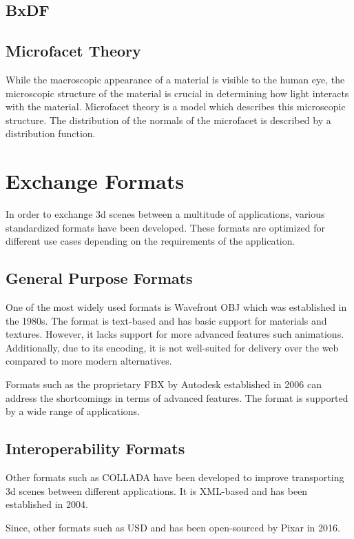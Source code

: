 \subsection{BxDF}
\subsection{Microfacet Theory}

While the macroscopic appearance of a material is visible to the human eye, the microscopic structure of the material is crucial in determining how light interacts with the material. Microfacet theory is a model which describes this microscopic structure. The distribution of the normals of the microfacet is described by a distribution function.

\section{Exchange Formats}

In order to exchange 3d scenes between a multitude of applications, various standardized formats have been developed. These formats are optimized for different use cases depending on the requirements of the application.

\subsection{General Purpose Formats}

One of the most widely used formats is Wavefront OBJ which was established in the 1980s. The format is text-based and has basic support for materials and textures. However, it lacks support for more advanced features such animations. Additionally, due to its encoding, it is not well-suited for delivery over the web compared to more modern alternatives.

Formats such as the proprietary FBX by Autodesk established in 2006 can address the shortcomings in terms of advanced features. The format is supported by a wide range of applications.

\subsection{Interoperability Formats}

Other formats such as COLLADA have been developed to improve transporting 3d scenes between different applications. It is XML-based and has been established in 2004.

Since, other formats such as USD and has been open-sourced by Pixar in 2016.

